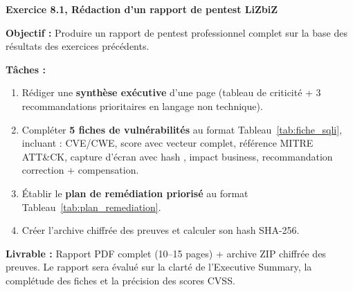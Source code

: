 \begin{boxexo}
\textbf{Exercice 8.1, Rédaction d'un rapport de pentest LiZbiZ}

\medskip
\textbf{Objectif :} Produire un rapport de pentest professionnel complet
sur la base des résultats des exercices précédents.

\medskip
\textbf{Tâches :}
\begin{enumerate}
    \item Rédiger une \textbf{synthèse exécutive} d'une page (tableau de
          criticité + 3 recommandations prioritaires en langage non technique).
    \item Compléter \textbf{5 fiches de vulnérabilités} au format
          Tableau~\ref{tab:fiche_sqli}, incluant :
          CVE/CWE, score  avec vecteur complet,
          référence MITRE ATT\&CK, capture d'écran  avec
          hash , impact business, recommandation
          correction + compensation.
    \item Établir le \textbf{plan de remédiation priorisé} au format
          Tableau~\ref{tab:plan_remediation}.
    \item Créer l'archive chiffrée des preuves et calculer son
          hash SHA-256.
\end{enumerate}

\medskip
\textbf{Livrable :} Rapport PDF complet (10--15 pages) + archive ZIP
chiffrée des preuves. Le rapport sera évalué sur la clarté de
l'Executive Summary, la complétude des fiches et la précision des
scores CVSS.
\end{boxexo}
